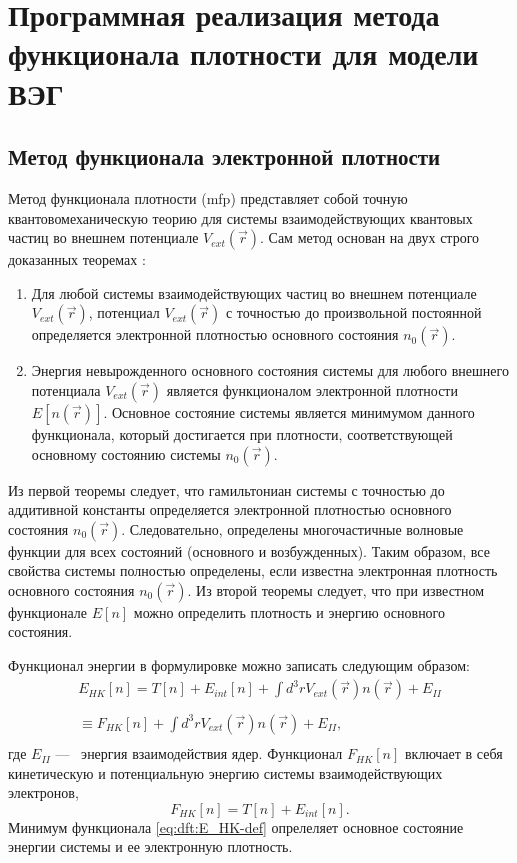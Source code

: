 
\chapter{Программная реализация метода функционала плотности для модели ВЭГ}

\section{Метод функционала электронной плотности}
Метод функционала плотности (\acrshort{mfp}) представляет собой точную\\ квантовомеханическую теорию для системы взаимодействующих квантовых частиц во внешнем потенциале $V_{ext} (\vec{r})$.
Сам метод основан на двух строго доказанных теоремах \cite{hohenberg:dft}:
\begin{enumerate}
    \item Для любой системы взаимодействующих частиц во внешнем потенциале $V_{ext} (\vec{r})$, потенциал $V_{ext} (\vec{r})$ с точностью до произвольной постоянной определяется электронной плотностью основного состояния $n_0 (\vec{r})$.
    \item Энергия невырожденного основного состояния системы для любого внешнего потенциала $V_{ext} (\vec{r})$ является функционалом электронной плотности $E[n(\vec{r})]$. Основное состояние системы является минимумом данного функционала, который достигается при плотности, соответствующей основному состоянию системы $n_0 (\vec{r})$.
\end{enumerate}

Из первой теоремы следует, что гамильтониан системы с точностью до аддитивной константы определяется электронной плотностью основного состояния $n_0 (\vec{r})$.
Следовательно, определены многочастичные волновые функции для всех состояний (основного и возбужденных).
Таким образом, все свойства системы полностью определены, если известна электронная плотность основного состояния $n_0 (\vec{r})$.
Из второй теоремы следует, что при известном функционале $E[n]$ можно определить плотность и энергию основного состояния.

Функционал энергии в формулировке \cite{hohenberg:dft} можно записать следующим образом:
\begin{multline}
    \label{eq:dft:E_HK-def}
    E_{HK} [n] = T[n] + E_{int} [n] + \int\limits_{}^{} d^3 r V_{ext} (\vec{r}) n(\vec{r}) + E_{II} \\
    \equiv F_{HK} [n] + \int\limits_{}^{}d^3 r V_{ext} (\vec{r}) n(\vec{r}) + E_{II},
\end{multline}
где $E_{II} $ ---~ энергия взаимодействия ядер. Функционал $F_{HK} [n]$ включает в себя кинетическую и потенциальную энергию системы взаимодействующих электронов,
\begin{equation}
    \label{eq:dft:F_HK-def}
    F_{HK} [n] = T[n] + E_{i n t} [n]. 
\end{equation}
Минимум функционала \eqref{eq:dft:E_HK-def} опрелеляет основное состояние энергии системы и ее электронную плотность.

